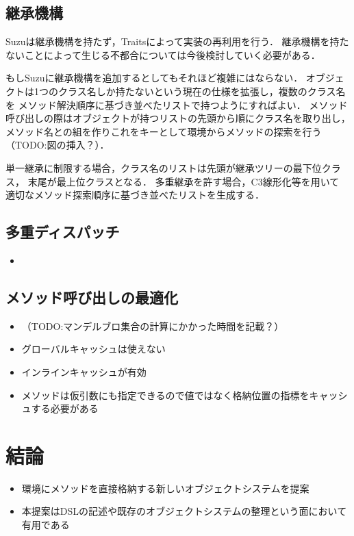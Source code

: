 \documentclass[withpage]{ipsjprosym}  %
\begin{document}
\subsection{継承機構}

Suzuは継承機構を持たず，Traitsによって実装の再利用を行う．
継承機構を持たないことによって生じる不都合については今後検討していく必要がある．

もしSuzuに継承機構を追加するとしてもそれほど複雑にはならない．
オブジェクトは1つのクラス名しか持たないという現在の仕様を拡張し，複数のクラス名を
メソッド解決順序に基づき並べたリストで持つようにすればよい．
メソッド呼び出しの際はオブジェクトが持つリストの先頭から順にクラス名を取り出し，
メソッド名との組を作りこれをキーとして環境からメソッドの探索を行う（TODO:図の挿入？）．

単一継承に制限する場合，クラス名のリストは先頭が継承ツリーの最下位クラス，
末尾が最上位クラスとなる．
多重継承を許す場合，C3線形化\cite{Barrett:1996:MSL:236337.236343}等を用いて
適切なメソッド探索順序に基づき並べたリストを生成する．

\subsection{多重ディスパッチ}

\begin{itemize}
\item 
\end{itemize}

\subsection{メソッド呼び出しの最適化}

\begin{itemize}
\item （TODO:マンデルブロ集合の計算にかかった時間を記載？）
\item グローバルキャッシュは使えない
\item インラインキャッシュが有効
\item メソッドは仮引数にも指定できるので値ではなく格納位置の指標をキャッシュする必要がある
\end{itemize}

\section{結論}

\begin{itemize}
\item 環境にメソッドを直接格納する新しいオブジェクトシステムを提案
\item 本提案はDSLの記述や既存のオブジェクトシステムの整理という面において有用である
\end{itemize}
\end{document}
